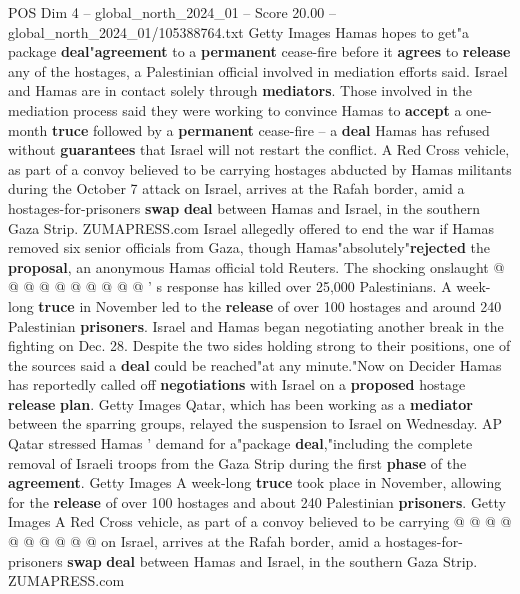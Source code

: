 \begin{textsample}{POS Dim 4 – global\_north\_2024\_01 – Score 20.00 – global\_north\_2024\_01/105388764.txt}
Getty Images Hamas hopes to get"a package \textbf{deal}"\textbf{agreement} to a \textbf{permanent} cease-fire before it \textbf{agrees} to \textbf{release} any of the hostages, a Palestinian official involved in mediation efforts said.
Israel and Hamas are in contact solely through \textbf{mediators}.
Those involved in the mediation process said they were working to convince Hamas to \textbf{accept} a one-month \textbf{truce} followed by a \textbf{permanent} cease-fire -- a \textbf{deal} Hamas has refused without \textbf{guarantees} that Israel will not restart the conflict.
A Red Cross vehicle, as part of a convoy believed to be carrying hostages abducted by Hamas militants during the October 7 attack on Israel, arrives at the Rafah border, amid a hostages-for-prisoners \textbf{swap} \textbf{deal} between Hamas and Israel, in the southern Gaza Strip.
ZUMAPRESS.com Israel allegedly offered to end the war if Hamas removed six senior officials from Gaza, though Hamas"absolutely"\textbf{rejected} the \textbf{proposal}, an anonymous Hamas official told Reuters.
The shocking onslaught @ @ @ @ @ @ @ @ @ @ ' s response has killed over 25,000 Palestinians.
A week-long \textbf{truce} in November led to the \textbf{release} of over 100 hostages and around 240 Palestinian \textbf{prisoners}.
Israel and Hamas began negotiating another break in the fighting on Dec. 28.
Despite the two sides holding strong to their positions, one of the sources said a \textbf{deal} could be reached"at any minute."Now on Decider Hamas has reportedly called off \textbf{negotiations} with Israel on a \textbf{proposed} hostage \textbf{release} \textbf{plan}.
Getty Images Qatar, which has been working as a \textbf{mediator} between the sparring groups, relayed the suspension to Israel on Wednesday.
AP Qatar stressed Hamas ' demand for a"package \textbf{deal},"including the complete removal of Israeli troops from the Gaza Strip during the first \textbf{phase} of the \textbf{agreement}.
Getty Images A week-long \textbf{truce} took place in November, allowing for the \textbf{release} of over 100 hostages and about 240 Palestinian \textbf{prisoners}.
Getty Images A Red Cross vehicle, as part of a convoy believed to be carrying @ @ @ @ @ @ @ @ @ @ on Israel, arrives at the Rafah border, amid a hostages-for-prisoners \textbf{swap} \textbf{deal} between Hamas and Israel, in the southern Gaza Strip.
ZUMAPRESS.com

\end{textsample}
